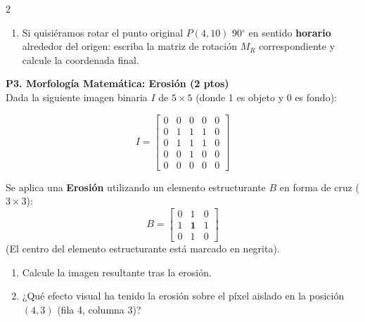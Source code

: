 \documentclass[a4paper,10pt]{extarticle}
\begin{document}
\begin{multicols*}{2}
\begin{enumerate}
    \item[(c)] Si quisiéramos rotar el punto original $P(4, 10)$ 90$^{\circ}$ en sentido \textbf{horario} alrededor del origen: escriba la matriz de rotación $M_R$ correspondiente y calcule la coordenada final.
\end{enumerate}

\vspace{1mm}


\textbf{P3. Morfología Matemática: Erosión (2 ptos)}\\
Dada la siguiente imagen binaria $I$ de $5 \times 5$ (donde 1 es objeto y 0 es fondo):

\[
I = 
\begin{bmatrix}
0 & 0 & 0 & 0 & 0 \\
0 & 1 & 1 & 1 & 0 \\
0 & 1 & 1 & 1 & 0 \\
0 & 0 & 1 & 0 & 0 \\
0 & 0 & 0 & 0 & 0
\end{bmatrix}
\]

Se aplica una \textbf{Erosión} utilizando un elemento estructurante $B$ en forma de cruz ($3 \times 3$):
\[
B = 
\begin{bmatrix}
0 & 1 & 0 \\
1 & \mathbf{1} & 1 \\
0 & 1 & 0
\end{bmatrix}
\]
(El centro del elemento estructurante está marcado en negrita).

\begin{enumerate}[label=\alph*)]
    \item Calcule la imagen resultante tras la erosión.
    \item ¿Qué efecto visual ha tenido la erosión sobre el píxel aislado en la posición $(4,3)$ (fila 4, columna 3)?
\end{enumerate}

\end{multicols*}
\end{document}
